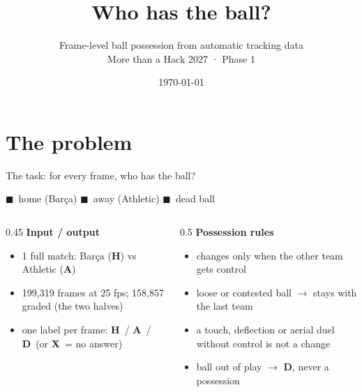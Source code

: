 \documentclass[aspectratio=169,10pt]{beamer}
\title{Who has the ball?}
\subtitle{Frame-level ball possession from automatic tracking data\\[2pt]
  \small More than a Hack 2027 · Phase 1}
\author{} %
\date{\today}
\newcommand{\Hl}{\textcolor{cH}{\textbf{H}}}
\newcommand{\Al}{\textcolor{cA}{\textbf{A}}}
\newcommand{\Dl}{\textcolor{cD!80!black}{\textbf{D}}}
\newcommand{\Xl}{\textcolor{black!50}{\textbf{X}}}
\newcommand{\sx}{0.041}   %
\newcommand{\hh}{0.42}    %
\def\yy{0}
\newcommand{\strip}[3]{%
  \def\yy{#1}
  \node[anchor=east,font=\scriptsize] at (-0.1,{#1+\hh/2}) {#2};
  
  \draw[black!40,line width=0.2pt] (0,#1) rectangle ({300*\sx},{#1+\hh});}
\newcommand{\timeaxis}[1]{%
  \draw[black!50] (0,#1) -- ({300*\sx},#1);
  \foreach \m in {0,1,...,5} {
    \draw[black!50] ({60*\m*\sx},#1) -- ({60*\m*\sx},{#1-0.08});
    \node[font=\tiny,below] at ({60*\m*\sx},{#1-0.05}) {\m:00};}}
\newcommand{\stripkey}{%
  {\scriptsize\textcolor{cH}{$\blacksquare$}~home (Barça) \quad
   \textcolor{cA}{$\blacksquare$}~away (Athletic) \quad
   \textcolor{cD}{$\blacksquare$}~dead ball}}
\begin{document}
\maketitle

\section{The problem}

\begin{frame}{The task: for every frame, who has the ball?}
  \centering

  \stripkey

  \vspace{0.4cm}
  \begin{columns}[T]
    \begin{column}{0.45\textwidth}
      \textbf{Input / output}
      \begin{itemize}\small
        \item 1 full match: Barça (\Hl) vs Athletic (\Al)
        \item 199{,}319 frames at 25 fps; 158{,}857 graded (the two halves)
        \item one label per frame: \Hl\ / \Al\ / \Dl\ (or \Xl\ = no answer)
      \end{itemize}
    \end{column}
    \begin{column}{0.5\textwidth}
      \textbf{Possession rules}
      \begin{itemize}\small
        \item changes only when the other team gets \alert{control}
        \item loose or contested ball $\to$ stays with the last team
        \item a touch, deflection or aerial duel without control is not a change
        \item ball out of play $\to$ \Dl, never a possession
      \end{itemize}
    \end{column}
  \end{columns}
\end{frame}
\end{document}
